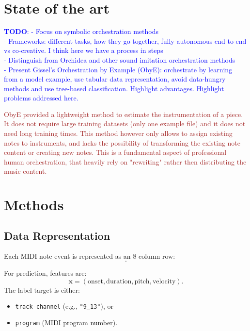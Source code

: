 \documentclass{aimc2026}
\newcommand{\todo}[1]{\textcolor{blue}{\textbf{TODO}: #1}}
\newcommand{\draft}[1]{\textcolor{brown}{#1}}
\begin{document}
\section{State of the art}

\todo{
- Focus on symbolic orchestration methods
\\
- Frameworks: different tasks, how they go together, fully autonomous end-to-end vs co-creative. I think here we have a process in steps
\\
- Distinguish from Orchidea and other sound imitation orchestration methods
\\
- Present Gissel's Orchestration by Example (ObyE): orchestrate by learning from a model example, use tabular data representation, avoid data-hungry methods and use tree-based classification. Highlight advantages. Highlight problems addressed here.
}

\draft{
ObyE provided a lightweight method to estimate the instrumentation of a piece. It does not require large training datasets (only one example file) and it does not need long training times. This method however only allows to assign existing notes to instruments, and lacks the possibility of transforming the existing note content or creating new notes. This is a fundamental aspect of professional human orchestration, that heavily rely on "rewriting" rather then distributing the music content.
}

\section{Methods}

\subsection{Data Representation}

Each MIDI note event is represented as an 8-column row:
\begin{displaymath}
	[\mbox{track number}, \mbox{track name}, \mbox{channel}, \mbox{program}, \mbox{onset}, \mbox{duration}, \mbox{pitch}, \mbox{velocity}].
\end{displaymath}

For prediction, features are:
\begin{displaymath}
\mathbf{x} = (\mbox{onset}, \mbox{duration}, \mbox{pitch}, \mbox{velocity}).
\end{displaymath}
The label target is either:
\begin{itemize}
	\item \texttt{track-channel} (e.g., \texttt{"9\_13"}), or
	\item \texttt{program} (MIDI program number).
\end{itemize}
\end{document}
